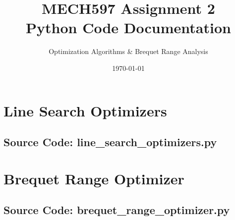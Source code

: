 \documentclass[11pt,a4paper]{article}
\title{\textbf{MECH597 Assignment 2}\\Python Code Documentation}
\author{Optimization Algorithms \& Brequet Range Analysis}
\date{\today}
\begin{document}
\maketitle
\tableofcontents
\newpage

\section{Line Search Optimizers}
\subsection{Source Code: line\_search\_optimizers.py}



\newpage
\section{Brequet Range Optimizer}
\subsection{Source Code: brequet\_range\_optimizer.py}


\end{document}
